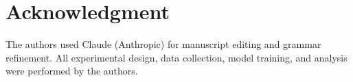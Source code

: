 \documentclass[conference]{IEEEtran}
\begin{document}
\section*{Acknowledgment}
The authors used Claude (Anthropic) for manuscript editing and grammar refinement. All experimental design, data collection, model training, and analysis were performed by the authors.



\end{document}
